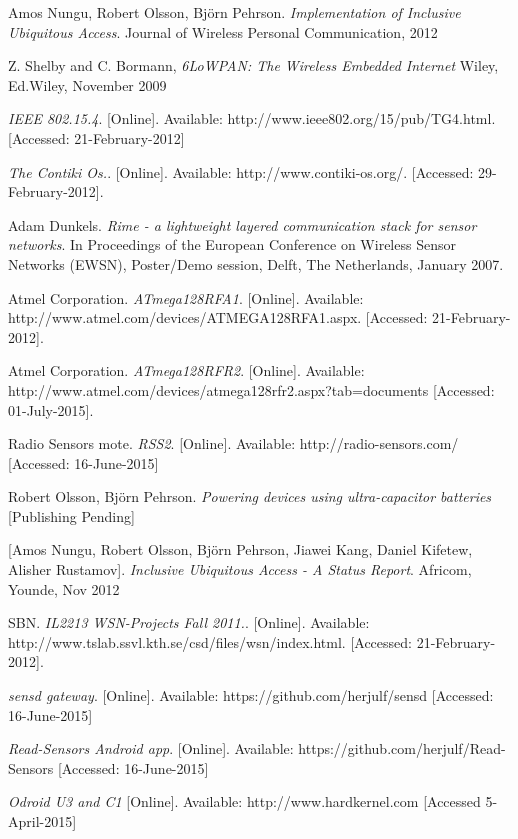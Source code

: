 \documentclass[conference, a4paper,10pt,twocolumn]{IEEEtran}
\begin{document}
\begin{thebibliography}{1}

 Amos Nungu, Robert Olsson, Bj\"{o}rn Pehrson. \emph{Implementation of Inclusive Ubiquitous Access}. 
Journal of Wireless Personal Communication, 2012

  Z. Shelby and C. Bormann, \emph{6LoWPAN: The Wireless Embedded Internet}
Wiley, Ed.Wiley, November 2009

  \emph{IEEE 802.15.4}. 
[Online]. Available: http://www.ieee802.org/15/pub/TG4.html. [Accessed: 21-February-2012]

  \emph{The Contiki Os.}. 
[Online]. Available: http://www.contiki-os.org/. [Accessed: 29-February-2012].

 Adam Dunkels. \emph{Rime - a lightweight layered communication stack for sensor networks}.   In Proceedings of the European Conference on Wireless Sensor Networks (EWSN), Poster/Demo session, Delft, The Netherlands, January 2007.

 Atmel Corporation. \emph{ATmega128RFA1}. 
[Online]. Available: http://www.atmel.com/devices/ATMEGA128RFA1.aspx. [Accessed: 21-February-2012].

 Atmel Corporation. \emph{ATmega128RFR2}. 
[Online]. Available: http://www.atmel.com/devices/atmega128rfr2.aspx?tab=documents [Accessed: 01-July-2015].


 Radio Sensors mote. \emph{RSS2}. 
[Online]. Available: http://radio-sensors.com/ [Accessed: 16-June-2015]

 Robert Olsson, Bj\"{o}rn Pehrson. \emph{Powering devices using ultra-capacitor batteries}
[Publishing Pending]

 [Amos Nungu, Robert Olsson, Bj\"{o}rn Pehrson, Jiawei Kang, Daniel Kifetew, Alisher Rustamov]. \emph{Inclusive Ubiquitous Access - A Status Report}. 
Africom, Younde, Nov 2012

 SBN. \emph{IL2213 WSN-Projects Fall 2011.}. 
[Online]. Available: http://www.tslab.ssvl.kth.se/csd/files/wsn/index.html. [Accessed: 21-February-2012].

  \emph{sensd gateway}. 
[Online]. Available: https://github.com/herjulf/sensd [Accessed: 16-June-2015]

  \emph{Read-Sensors Android app}. 
[Online]. Available: https://github.com/herjulf/Read-Sensors [Accessed: 16-June-2015]


 \emph{Odroid U3 and C1}
[Online]. Available: http://www.hardkernel.com [Accessed 5-April-2015]
\end{thebibliography}
\end{document}
